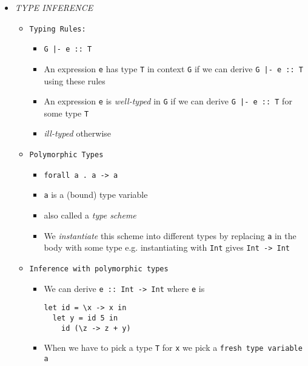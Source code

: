 \documentclass[landscape,8pt]{extarticle}
\newcommand{\code}{\lstinline}
\begin{document}
\begin{multicols}{3}
\begin{itemize}
\begin{lstlisting}
-- sets
EMPTY   = \x -> FALSE
INSERT  = \n s x -> ITE (EQL n x) TRUE (s x)
HAS     = \s x -> s x
INTERSECT   = \s1 s2 x -> AND (s1 x) (s2 x)
            \end{lstlisting}
        \item \emph{TYPE INFERENCE}
              \begin{itemize}
                  \item \code{Typing Rules:}
                        \begin{itemize}
                            \item \code{G |- e :: T}
                            \item An expression \code{e} has type \code{T} in context \code{G} if we can derive \code{G |- e :: T} using these rules
                            \item An expression \code{e} is \emph{well-typed} in \code{G} if we can derive \code{G |- e :: T} for some type \code{T}
                            \item \emph{ill-typed} otherwise
                        \end{itemize}
                  \item \code{Polymorphic Types}
                        \begin{itemize}
                            \item \code{forall a . a -> a}
                            \item \code{a} is a (bound) type variable
                            \item also called a \emph{type scheme}
                            \item We \emph{instantiate} this scheme into different types by replacing \code{a} in the body with some type e.g. instantiating with \code{Int} gives \code{Int -> Int}
                        \end{itemize}
                  \item \code{Inference with polymorphic types}
                        \begin{itemize}
                            \item We can derive \code{e :: Int -> Int} where \code{e} is
                                  \begin{lstlisting}
let id = \x -> x in
  let y = id 5 in
    id (\z -> z + y)
\end{lstlisting}
                            \item When we have to pick a type \code{T} for \code{x} we pick a \code{fresh type variable} \code{a}

\end{itemize}
\end{itemize}
\end{itemize}
\end{multicols}
\end{document}
